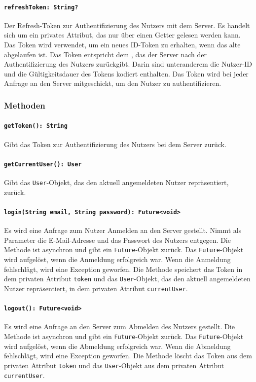 \documentclass{entwurfsheft}
\begin{document}
\paragraph{\texttt{refreshToken: String?}}
Der Refresh-Token zur Authentifizierung des Nutzers mit dem Server. Es handelt sich um ein privates Attribut, das nur über einen Getter gelesen werden kann. Das Token wird verwendet, um ein neues ID-Token zu erhalten, wenn das alte abgelaufen ist. Das Token entspricht dem , das der Server nach der Authentifizierung des Nutzers zurückgibt. Darin sind unteranderem die Nutzer-ID und die Gültigkeitsdauer des Tokens kodiert enthalten. Das Token wird bei jeder Anfrage an den Server mitgeschickt, um den Nutzer zu authentifizieren.

\subsubsection*{Methoden}
\paragraph{\texttt{getToken(): String}}
Gibt das Token zur Authentifizierung des Nutzers bei dem Server zurück.
\paragraph{\texttt{getCurrentUser(): User}}
Gibt das \texttt{User}-Objekt, das den aktuell angemeldeten Nutzer repräsentiert, zurück.
\paragraph{\texttt{login(String email, String password): Future<void>}}
Es wird eine Anfrage zum Nutzer Anmelden an den Server gestellt. Nimmt als Parameter die E-Mail-Adresse und das Passwort des Nutzers entgegen. Die Methode ist asynchron und gibt ein \texttt{Future}-Objekt zurück. Das \texttt{Future}-Objekt wird aufgelöst, wenn die Anmeldung erfolgreich war. Wenn die Anmeldung fehlschlägt, wird eine Exception geworfen. Die Methode speichert das Token in dem privaten Attribut \texttt{token} und das \texttt{User}-Objekt, das den aktuell angemeldeten Nutzer repräsentiert, in dem privaten Attribut \texttt{currentUser}.
\paragraph{\texttt{logout(): Future<void>}}
Es wird eine Anfrage an den Server zum Abmelden des Nutzers gestellt. Die Methode ist asynchron und gibt ein \texttt{Future}-Objekt zurück. Das \texttt{Future}-Objekt wird aufgelöst, wenn die Abmeldung erfolgreich war. Wenn die Abmeldung fehlschlägt, wird eine Exception geworfen. Die Methode löscht das Token aus dem privaten Attribut \texttt{token} und das \texttt{User}-Objekt aus dem privaten Attribut \texttt{currentUser}.
\end{document}
